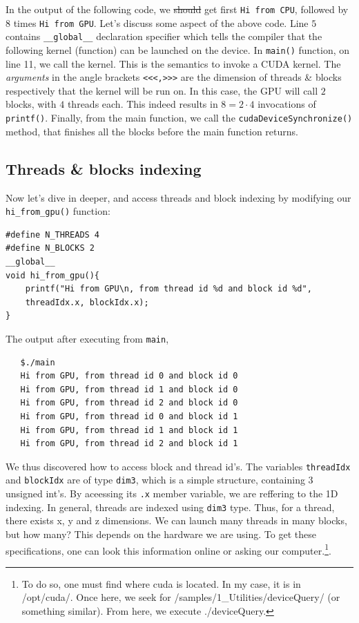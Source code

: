 \documentclass[12pt]{article}
\begin{document}
In the output of the following code, we \sout{should} get first \verb|Hi from CPU|, 
followed by 8 times \verb|Hi from GPU|. Let's discuss some aspect of the above code.
Line $5$ contains \verb|__global__| declaration specifier which tells 
the compiler that the following kernel (function) can be launched on the device.
In \verb|main()| function, on line 11, we call the kernel. This is the semantics to 
invoke a CUDA kernel. The \textit{arguments} in the angle brackets \verb|<<<,>>>| 
are the dimension of threads \& blocks respectively that the kernel will be run on. In this case, 
the GPU will call $2$ blocks, with $4$ threads each. This indeed results in 
$8 = 2\cdot 4$ invocations of \verb|printf()|. Finally, from the main function, we call 
the \verb|cudaDeviceSynchronize()| method, that finishes all the blocks before the main 
function returns.

\subsection{Threads \& blocks indexing}
Now let's dive in deeper, and access threads and block indexing by modifying our 
\verb|hi_from_gpu()| function:
\vspace{-0.5cm}
\begin{verbatim}
#define N_THREADS 4
#define N_BLOCKS 2
__global__ 
void hi_from_gpu(){
    printf("Hi from GPU\n, from thread id %d and block id %d", 
    threadIdx.x, blockIdx.x);
}
\end{verbatim}
The output after executing from \verb|main|,
\vspace{-0.5cm}
\begin{verbatim}
   $./main
   Hi from GPU, from thread id 0 and block id 0 
   Hi from GPU, from thread id 1 and block id 0 
   Hi from GPU, from thread id 2 and block id 0 
   Hi from GPU, from thread id 0 and block id 1 
   Hi from GPU, from thread id 1 and block id 1 
   Hi from GPU, from thread id 2 and block id 1 
\end{verbatim}
\vspace{-0.5cm}
We thus discovered how to access block and thread id's. The 
variables \verb|threadIdx| and \verb|blockIdx| are of type \verb|dim3|,
which is a simple structure, containing 3 unsigned int's. By aceessing 
its \verb|.x| member variable, we are reffering to the 1D indexing. In general, 
threads are indexed using \verb|dim3| type. Thus, for a thread, there exists x, y and z 
dimensions.
We can launch many threads in many blocks, but how many? This depends on 
the hardware we are using.
To get these specifications, one can look this information online or asking our computer.\footnote{
To do so, one must find where {\selectfont cuda} is located. In my case, it is in 
{\selectfont /opt/cuda/}.
Once here, we seek for {\selectfont /samples/1\_Utilities/deviceQuery/} 
(or something similar). 
From here, we execute {\selectfont ./deviceQuery}.   
}.
\end{document}
